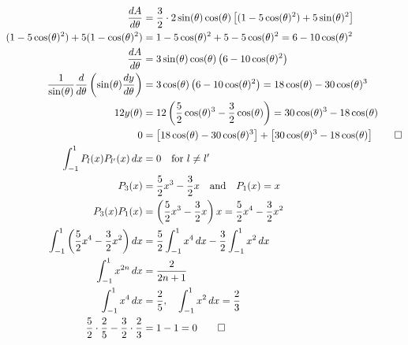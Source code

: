 \begin{hwkProblem}{3.17}{}
\begin{align*}
		\frac{dA}{d\theta} &= \frac{3}{2}\cdot 2\sin{\theta}\cos{\theta} \left[(1-5\cos{\theta}^2)+5\sin{\theta}^2\right] \\
		(1-5\cos{\theta}^2)+5(1-\cos{\theta}^2) &= 1-5\cos{\theta}^2+5-5\cos{\theta}^2 = 6-10\cos{\theta}^2 \\
		\frac{dA}{d\theta} &= 3\sin{\theta}\cos{\theta} \left(6-10\cos{\theta}^2\right) \\
		\frac{1}{\sin{\theta}}\frac{d}{d\theta}\left(\sin{\theta}\frac{dy}{d\theta}\right) &= 3\cos{\theta}\left(6-10\cos{\theta}^2\right) = 18\cos{\theta}-30\cos{\theta}^3 \\
		12y(\theta) &= 12\left(\frac{5}{2}\cos{\theta}^3-\frac{3}{2}\cos{\theta}\right) = 30\cos{\theta}^3-18\cos{\theta} \\
		0 &= \left[18\cos{\theta}-30\cos{\theta}^3\right] + \left[30\cos{\theta}^3-18\cos{\theta}\right] \qed \\
		\int_{-1}^{1} P_l(x) P_{l'}(x) \, dx &= 0 \quad \text{for } l\neq l' \\
		P_3(x) &= \frac{5}{2}x^3-\frac{3}{2}x \quad \text{and} \quad P_1(x)= x \\
		P_3(x)P_1(x) &= \left(\frac{5}{2}x^3-\frac{3}{2}x\right)x = \frac{5}{2}x^4-\frac{3}{2}x^2 \\
		\int_{-1}^{1} \left(\frac{5}{2}x^4-\frac{3}{2}x^2\right)dx &= \frac{5}{2}\int_{-1}^{1} x^4\,dx - \frac{3}{2}\int_{-1}^{1} x^2\,dx \\
		\int_{-1}^{1} x^{2n}\,dx &= \frac{2}{2n+1} \\
		\int_{-1}^{1} x^4\,dx &= \frac{2}{5}, \quad \int_{-1}^{1} x^2\,dx = \frac{2}{3} \\
		\frac{5}{2}\cdot \frac{2}{5} - \frac{3}{2}\cdot \frac{2}{3} &= 1 - 1 = 0 \qed \\
	\end{align*}

\end{hwkProblem}

